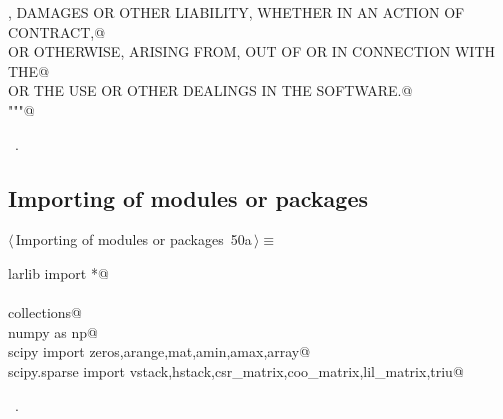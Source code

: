\documentclass[11pt,oneside]{article}	%
\begin{document}
\begin{flushleft}
\begin{list}{}{}
\mbox{}\verb@CLAIM, DAMAGES OR OTHER LIABILITY, WHETHER IN AN ACTION OF CONTRACT,@\\
\mbox{}\verb@TORT OR OTHERWISE, ARISING FROM, OUT OF OR IN CONNECTION WITH THE@\\
\mbox{}\verb@SOFTWARE OR THE USE OR OTHER DEALINGS IN THE SOFTWARE.@\\
\mbox{}\verb@"""@\\
\mbox{}\verb@@{\NWsep}
\end{list}
\vspace{-1ex}
\footnotesize\addtolength{\baselineskip}{-1ex}
\begin{list}{}{\setlength{\itemsep}{-\parsep}\setlength{\itemindent}{-\leftmargin}}
\item \NWtxtMacroRefIn\ .
\end{list}
\end{flushleft}
\subsection{Importing of modules or packages}
\begin{flushleft} \small \label{scrap81}
\protect{}$\langle\,$Importing of modules or packages\nobreak\ {\footnotesize 50a}$\,\rangle\equiv$
\vspace{-1ex}
\begin{list}{}{} \item
\mbox{}\verb@from larlib import *@\\
\mbox{}\verb@@\\
\mbox{}\verb@import collections@\\
\mbox{}\verb@import numpy as np@\\
\mbox{}\verb@from scipy import zeros,arange,mat,amin,amax,array@\\
\mbox{}\verb@from scipy.sparse import vstack,hstack,csr_matrix,coo_matrix,lil_matrix,triu@\\
\mbox{}\verb@@{\NWsep}
\end{list}
\vspace{-1ex}
\footnotesize\addtolength{\baselineskip}{-1ex}
\begin{list}{}{\setlength{\itemsep}{-\parsep}\setlength{\itemindent}{-\leftmargin}}
\item \NWtxtMacroRefIn\ .
\end{list}
\end{flushleft}
\end{document}
